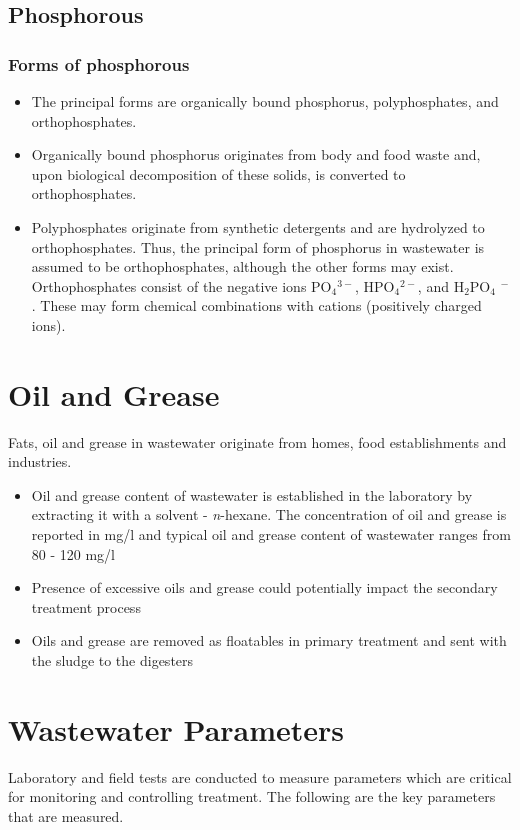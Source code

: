 		\subsection{Phosphorous}			
		\subsubsection{Forms of phosphorous}
					      \begin{itemize}
					      	\item The principal forms are organically bound phosphorus, polyphosphates, and orthophosphates.
					      	\item Organically bound phosphorus originates from body and food waste and, upon biological decomposition of these solids, is converted to orthophosphates. 
					      	\item Polyphosphates originate from synthetic detergents and are hydrolyzed to orthophosphates. Thus, the principal form of phosphorus in wastewater is assumed to be orthophosphates, although the other forms may exist. Orthophosphates consist of the negative ions PO$_4$$^{3-}$, HPO$_4$$^{2-}$, and H$_2$PO$_4$ $^-$.  These may form chemical combinations with cations (positively charged ions).
					      \end{itemize}

\section{Oil and Grease}	
			Fats, oil and grease in wastewater originate from homes, food establishments and industries.
			\begin{itemize}
				\item Oil and grease content of wastewater is established in the laboratory by extracting it with a solvent - \textit{n}-hexane.  The concentration of oil and grease is reported in mg/l and typical oil and grease content of wastewater ranges from 80 - 120 mg/l
				\item Presence of excessive oils and grease could potentially impact the secondary treatment process
				\item Oils and grease are removed as floatables in primary treatment and sent with the sludge to the digesters
			\end{itemize}
		



\section{Wastewater Parameters}			
		Laboratory and field tests are conducted to measure parameters which are critical for monitoring and controlling treatment.  The following are the key parameters that are measured.	
			
